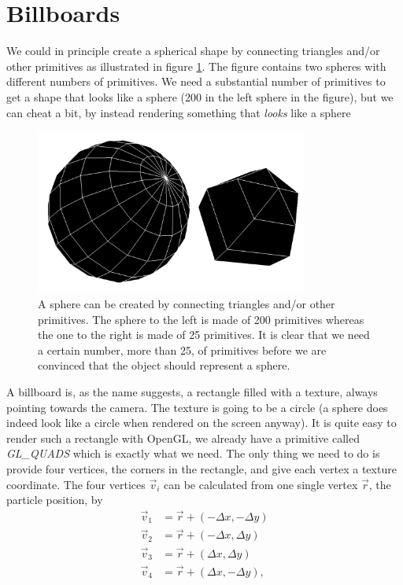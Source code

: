 \section{Billboards}
\label{sec:vis_billboards}
We could in principle create a spherical shape by connecting triangles and/or other primitives as illustrated in figure \ref{fig:visualization_glut_spheres}. The figure contains two spheres with different numbers of primitives. We need a substantial number of primitives to get a shape that looks like a sphere (200 in the left sphere in the figure), but we can cheat a bit, by instead rendering something that \textit{looks} like a sphere
\begin{figure}[h]
\begin{center}
\includegraphics[width=0.8\textwidth, trim=0cm 0cm 0cm 0cm, clip]{visualization/figures/glut_spheres.png}
\end{center}
\caption{A sphere can be created by connecting triangles and/or other primitives. The sphere to the left is made of 200 primitives whereas the one to the right is made of 25 primitives. It is clear that we need a certain number, more than 25, of primitives before we are convinced that the object should represent a sphere.}
\label{fig:visualization_glut_spheres}
\end{figure}
A billboard is, as the name suggests, a rectangle filled with a texture, always pointing towards the camera. The texture is going to be a circle (a sphere does indeed look like a circle when rendered on the screen anyway). It is quite easy to render such a rectangle with OpenGL, we already have a primitive called \textit{GL\_QUADS} which is exactly what we need. The only thing we need to do is provide four vertices, the corners in the rectangle, and give each vertex a texture coordinate. The four vertices $\vec v_i$ can be calculated from one single vertex $\vec r$, the particle position, by
\begin{align}
	\label{eq:vis_vertices_billboard}
	\vec v_1 &= \vec r + (-\Delta x, -\Delta y)\\
	\nonumber
	\vec v_2 &= \vec r + (-\Delta x, \Delta y)\\
	\nonumber
	\vec v_3 &= \vec r + (\Delta x, \Delta y)\\
	\nonumber
	\vec v_4 &= \vec r + (\Delta x, -\Delta y),
\end{align}
